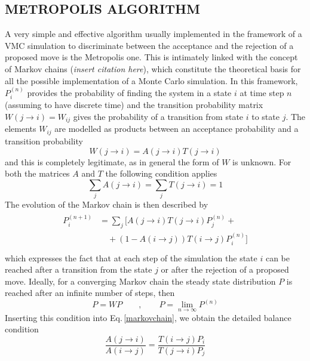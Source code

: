 \subsection{METROPOLIS ALGORITHM}
A very simple and effective algorithm usually implemented in the framework of a VMC simulation to discriminate between the acceptance and the rejection of a proposed move is the Metropolis one. This is intimately linked with the concept of Markov chains (\textit{insert citation here}), which constitute the theoretical basis for all the possible implementation of a Monte Carlo simulation. In this framework, $P_i^{(n)}$ provides the probability of finding the system in a state $i$ at time step $n$ (assuming to have discrete time) and the transition probability matrix $W(j \rightarrow i) = W_{ij}$ gives the probability of a transition from state $i$ to state $j$. The elements $W_{ij}$ are modelled as products between an acceptance probability and a transition probability
\begin{equation*}
    W(j\rightarrow i) = A(j\rightarrow i) T(j\rightarrow i)
\end{equation*}
and this is completely legitimate, as in general the form of $W$ is unknown. For both the matrices $A$ and $T$ the following condition applies
\begin{equation*}
    \sum_j A(j\rightarrow i) = \sum_j T(j\rightarrow i) = 1
\end{equation*}
The evolution of the Markov chain is then described by
\begin{align}
\begin{split}
    P_i^{(n+1)} &= \sum_j \bigg[ A(j\rightarrow i) T(j\rightarrow i) P_j^{(n)} + \\
    &\quad + (1 - A(i\rightarrow j)) T(i\rightarrow j) P_i^{(n)} \bigg] \\
\end{split}
\label{markovchain}
\end{align}
which expresses the fact that at each step of the simulation the state $i$ can be reached after a transition from the state $j$ or after the rejection of a proposed move. Ideally, for a converging Markov chain the steady state distribution $P$ is reached after an infinite number of steps, then
\begin{equation*}
    P=WP \qquad, \qquad P = \lim_{n\rightarrow \infty} P^{(n)}
\end{equation*}
Inserting this condition into Eq.\,\ref{markovchain}, we obtain the detailed balance condition
\begin{equation}
    \frac{A(j\rightarrow i)}{A(i\rightarrow j)} =  \frac{ T(i\rightarrow j) P_i}{T(j\rightarrow i) P_j}
    \label{metropolis_ratio}
\end{equation}
